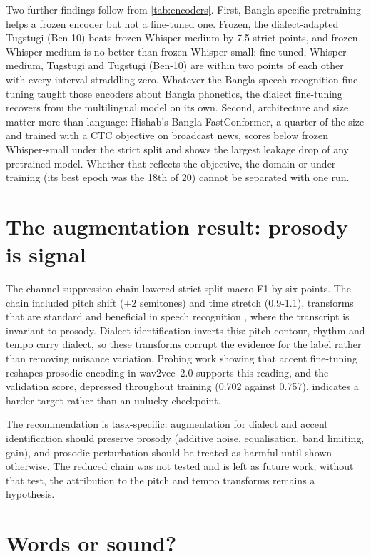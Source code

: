 Two further findings follow from \cref{tab:encoders}. First, Bangla-specific
pretraining helps a frozen encoder but not a fine-tuned one. Frozen, the
dialect-adapted Tugstugi (Ben-10) beats frozen Whisper-medium by 7.5 strict
points, and frozen Whisper-medium is no better than frozen Whisper-small;
fine-tuned, Whisper-medium, Tugstugi and Tugstugi (Ben-10) are within two
points of each other with every interval straddling zero. Whatever the Bangla
speech-recognition fine-tuning taught those encoders about Bangla phonetics,
the dialect fine-tuning recovers from the multilingual model on its own.
Second, architecture and size matter more than language: Hishab's
Bangla FastConformer, a quarter of the size and trained with a CTC objective
on broadcast news, scores below frozen Whisper-small under the strict split
and shows the largest leakage drop of any pretrained model. Whether that
reflects the objective, the domain or under-training (its best epoch was the
18th of 20) cannot be separated with one run.

\section{The augmentation result: prosody is signal}
\label{sec:disc-augment}

The channel-suppression chain lowered strict-split macro-F1 by six points. The
chain included pitch shift ($\pm 2$ semitones) and time stretch (0.9-1.1),
transforms that are standard and beneficial in speech recognition
\cite{Ko2015Audio}, where the transcript is invariant to prosody.
Dialect identification inverts this: pitch contour, rhythm and tempo carry
dialect, so these transforms corrupt the evidence for the label rather than
removing nuisance variation. Probing work showing that accent fine-tuning
reshapes prosodic encoding in wav2vec~2.0 \cite{Yang2023Accent} supports this
reading, and the validation score, depressed throughout training (0.702 against
0.757), indicates a harder target rather than an unlucky checkpoint.

The recommendation is task-specific: augmentation for dialect and accent
identification should preserve prosody (additive noise, equalisation, band
limiting, gain), and prosodic perturbation should be treated as harmful until
shown otherwise. The reduced chain was not tested and is left as future work;
without that test, the attribution to the pitch and tempo transforms remains a
hypothesis.

\section{Words or sound?}
\label{sec:disc-words}

